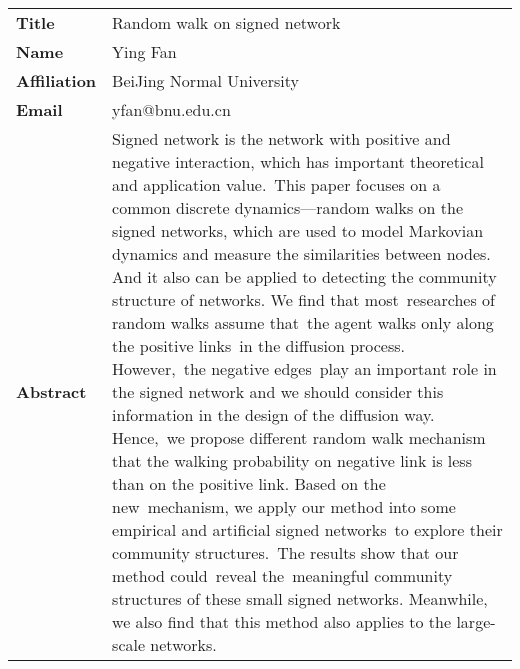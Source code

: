 \documentclass[oneside,A4paper,12pt]{article}
\begin{document}
\newpage
\begin{longtable}{p{2cm}p{14cm}}
\toprule
\textbf{Title} & Random walk on signed network\\
\textbf{Name} & Ying Fan\\
\textbf{Affiliation} & BeiJing Normal University\\
\textbf{Email} & yfan@bnu.edu.cn\\
\textbf{Abstract} & Signed network is the network with positive and negative interaction, which has important theoretical and application value. This paper focuses on a common discrete dynamics---random walks on the signed networks, which are used to model Markovian dynamics and measure the similarities between nodes. And it also can be applied to detecting the community structure of networks. We find that most researches of random walks assume that the agent walks only along the positive links in the diffusion process. However, the negative edges play an important role in the signed network and we should consider this information in the design of the diffusion way. Hence, we propose different random walk mechanism that the walking probability on negative link is less than on the positive link. Based on the new mechanism, we apply our method into some empirical and artificial signed networks to explore their community structures. The results show that our method could reveal the meaningful community structures of these small signed networks. Meanwhile, we also find that this method also applies to the large-scale networks.\\
\bottomrule
\end{longtable}

\newpage
\end{document}
